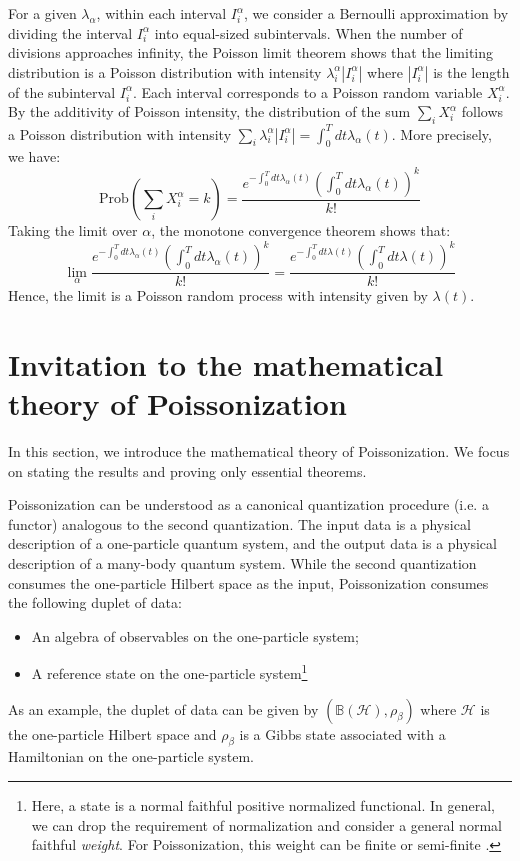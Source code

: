 \documentclass[a4paper,11pt]{article}
\theoremstyle{definition}
\numberwithin{equation}{section}
\newcommand{\lb}{\left(}
\newcommand{\rb}{\right)}
\begin{document}
For a given $\lambda_\alpha$, within each interval $I_i^\alpha$, we consider a Bernoulli approximation by dividing the interval $I_i^\alpha$ into equal-sized subintervals. When the number of divisions approaches infinity, the Poisson limit theorem shows that the limiting distribution is a Poisson distribution with intensity $\lambda_i^\alpha|I_i^\alpha|$ where $|I_i^\alpha|$ is the length of the subinterval $I_i^\alpha$. Each interval corresponds to a Poisson random variable $X_i^\alpha$. By the additivity of Poisson intensity, the distribution of the sum $\sum_i X_i^\alpha$ follows a Poisson distribution with intensity $\sum_i\lambda_i^\alpha |I_i^\alpha| = \int_0^T dt\lambda_\alpha(t)$. More precisely, we have:
\begin{equation}
    \text{Prob}(\sum_i X^\alpha_i = k) = \frac{e^{-\int_0^T dt\lambda_\alpha(t)}(\int_0^Tdt\lambda_\alpha(t))^k}{k!}
\end{equation}Taking the limit over $\alpha$, the monotone convergence theorem shows that:
\begin{equation}
    \lim_\alpha\frac{e^{-\int_0^T dt\lambda_\alpha(t)}(\int_0^Tdt\lambda_\alpha(t))^k}{k!} = \frac{e^{-\int_0^Tdt\lambda(t)}(\int_0^Tdt\lambda(t))^k}{k!}
\end{equation}
Hence, the limit is a Poisson random process with intensity given by $\lambda(t)$.



\section{Invitation to the mathematical theory of Poissonization}\label{app:math}

In this section, we introduce the mathematical theory of Poissonization. We focus on stating the results and proving only essential theorems.

Poissonization can be understood as a canonical quantization procedure (i.e. a functor) analogous to the second quantization. The input data is a physical description of a one-particle quantum system, and the output data is a physical description of a many-body quantum system. While the second quantization consumes the one-particle Hilbert space as the input, Poissonization consumes the following duplet of data:
\begin{itemize}
    \item An algebra of observables on the one-particle system;
    \item A reference state on the one-particle system\footnote{Here, a state is a normal faithful positive normalized functional. In general, we can drop the requirement of normalization and consider a general normal faithful \textit{weight}. For Poissonization, this weight can be finite or semi-finite \cite{T}.}
\end{itemize}
As an example, the duplet of data can be given by $\lb\mathbb{B}(\mathcal{H}), \rho_\beta\rb$ where $\mathcal{H}$ is the one-particle Hilbert space and $\rho_\beta$ is a Gibbs state associated with a Hamiltonian on the one-particle system.
\end{document}
